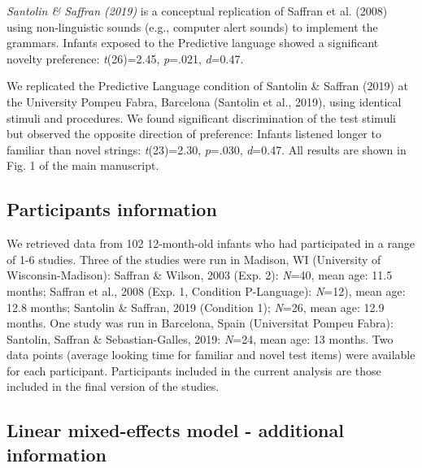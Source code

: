 \begin{appendix}
\emph{Santolin \& Saffran (2019)} is a conceptual replication of Saffran
et al. (2008) using non-linguistic sounds (e.g., computer alert sounds)
to implement the grammars. Infants exposed to the Predictive language
showed a significant novelty preference: \emph{t}(26)=2.45,
\emph{p}=.021, \emph{d}=0.47.

We replicated the Predictive Language condition of Santolin \& Saffran
(2019) at the University Pompeu Fabra, Barcelona (Santolin et al.,
2019), using identical stimuli and procedures. We found significant
discrimination of the test stimuli but observed the opposite direction
of preference: Infants listened longer to familiar than novel strings:
\emph{t}(23)=2.30, \emph{p}=.030, \emph{d}=0.47. All results are shown
in Fig. 1 of the main manuscript.

\hypertarget{participants-information}{%
\subsection{Participants information}\label{participants-information}}

We retrieved data from 102 12-month-old infants who had participated in
a range of 1-6 studies. Three of the studies were run in Madison, WI
(University of Wisconsin-Madison): Saffran \& Wilson, 2003 (Exp. 2):
\emph{N}=40, mean age: 11.5 months; Saffran et al., 2008 (Exp. 1,
Condition P-Language): \emph{N}=12), mean age: 12.8 months; Santolin \&
Saffran, 2019 (Condition 1); \emph{N}=26, mean age: 12.9 months. One
study was run in Barcelona, Spain (Universitat Pompeu Fabra): Santolin,
Saffran \& Sebastian-Galles, 2019: \emph{N}=24, mean age: 13 months. Two
data points (average looking time for familiar and novel test items)
were available for each participant. Participants included in the
current analysis are those included in the final version of the studies.

\hypertarget{linear-mixed-effects-model---additional-information}{%
\subsection{Linear mixed-effects model - additional
information}\label{linear-mixed-effects-model---additional-information}}


\end{appendix}
